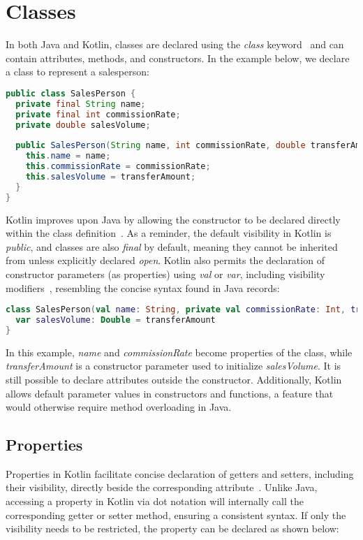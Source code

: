 \documentclass[a4paper,11pt]{article}
\begin{document}
\section{Classes}
In both Java and Kotlin, classes are declared using the \textit{class} keyword~\cite{classes} and can contain attributes, methods, and constructors. In the example below, we declare a class to represent a salesperson:

\begin{lstlisting}[language=Java, title={Java Class Declaration}]
public class SalesPerson {
  private final String name;
  private final int commissionRate;
  private double salesVolume;
  
  public SalesPerson(String name, int commissionRate, double transferAmount) {
    this.name = name;
    this.commissionRate = commissionRate;
    this.salesVolume = transferAmount;
  }
}
\end{lstlisting}
Kotlin improves upon Java by allowing the constructor to be declared directly within the class definition~\cite{classes-constructors}. As a reminder, the default visibility in Kotlin is \textit{public}, and classes are also \textit{final} by default, meaning they cannot be inherited from unless explicitly declared \textit{open}. Kotlin also permits the declaration of constructor parameters (as properties) using \textit{val} or \textit{var}, including visibility modifiers~\cite{classes-constructors}, resembling the concise syntax found in Java records:

\begin{lstlisting}[language=Kotlin,title={Kotlin Class Declaration}]
class SalesPerson(val name: String, private val commissionRate: Int, transferAmount: Double = 0.0) {
  var salesVolume: Double = transferAmount
}
\end{lstlisting}

In this example, \textit{name} and \textit{commissionRate} become properties of the class, while \textit{transferAmount} is a constructor parameter used to initialize \textit{salesVolume}. It is still possible to declare attributes outside the constructor. Additionally, Kotlin allows default parameter values in constructors and functions, a feature that would otherwise require method overloading in Java.

\subsection{Properties}
Properties in Kotlin facilitate concise declaration of getters and setters, including their visibility, directly beside the corresponding attribute~\cite{declaring-properties,properties-getters-setters}. Unlike Java, accessing a property in Kotlin via dot notation will internally call the corresponding getter or setter method, ensuring a consistent syntax.
If only the visibility needs to be restricted, the property can be declared as shown below:
\end{document}
